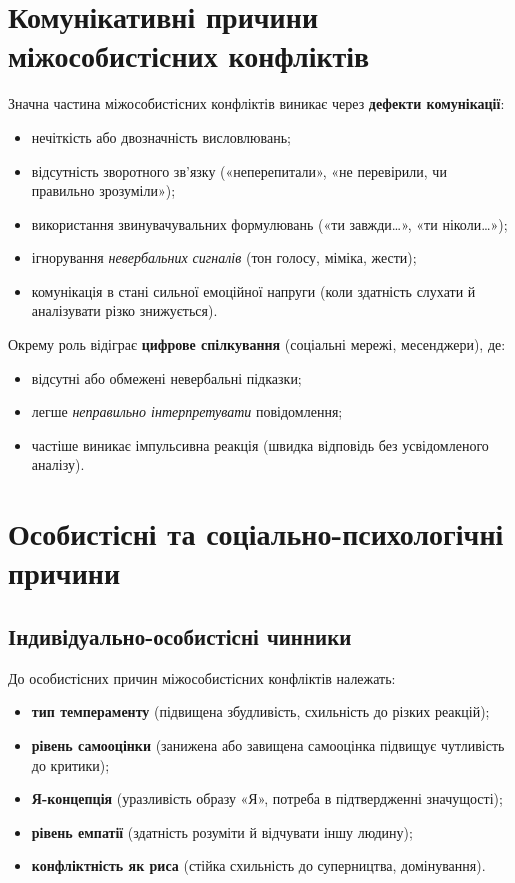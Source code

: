 \documentclass[12pt,a4paper]{article}
\begin{document}
    \section*{Комунікативні причини міжособистісних конфліктів}
    Значна частина міжособистісних конфліктів виникає через \textbf{дефекти комунікації}:
    \begin{itemize}
        \item нечіткість або двозначність висловлювань;
        \item відсутність зворотного зв’язку («неперепитали», «не перевірили, чи правильно зрозуміли»);
        \item використання звинувачувальних формулювань («ти завжди…», «ти ніколи…»);
        \item ігнорування \textit{невербальних сигналів} (тон голосу, міміка, жести);
        \item комунікація в стані сильної емоційної напруги (коли здатність слухати й аналізувати різко знижується).
    \end{itemize}

    Окрему роль відіграє \textbf{цифрове спілкування} (соціальні мережі, месенджери), де:
    \begin{itemize}
        \item відсутні або обмежені невербальні підказки;
        \item легше \textit{неправильно інтерпретувати} повідомлення;
        \item частіше виникає імпульсивна реакція (швидка відповідь без усвідомленого аналізу).
    \end{itemize}

    \section*{Особистісні та соціально-психологічні причини}
    \subsection*{Індивідуально-особистісні чинники}
    До особистісних причин міжособистісних конфліктів належать:
    \begin{itemize}
        \item \textbf{тип темпераменту} (підвищена збудливість, схильність до різких реакцій);
        \item \textbf{рівень самооцінки} (занижена або завищена самооцінка підвищує чутливість до критики);
        \item \textbf{Я-концепція} (уразливість образу «Я», потреба в підтвердженні значущості);
        \item \textbf{рівень емпатії} (здатність розуміти й відчувати іншу людину);
        \item \textbf{конфліктність як риса} (стійка схильність до суперництва, домінування).
    \end{itemize}
\end{document}
